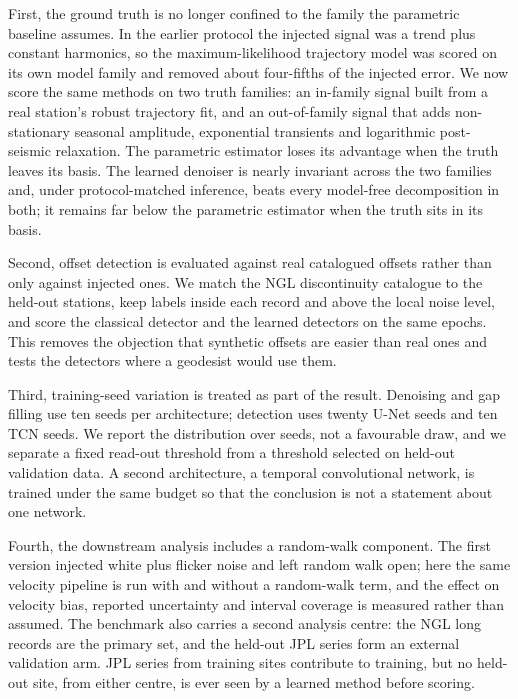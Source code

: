 First, the ground truth is no longer confined to the family the parametric
baseline assumes. In the earlier protocol the injected signal was a trend plus
constant harmonics, so the maximum-likelihood trajectory model was scored on its
own model family and removed about four-fifths of the injected error. We now
score the same methods on two truth families: an in-family signal built from a
real station's robust trajectory fit, and an out-of-family signal that adds
non-stationary seasonal amplitude, exponential transients and logarithmic
post-seismic relaxation. The parametric estimator loses its advantage when the
truth leaves its basis. The learned denoiser is nearly invariant across the two
families and, under protocol-matched inference, beats every model-free
decomposition in both; it remains far below the parametric estimator when the
truth sits in its basis.

Second, offset detection is evaluated against real catalogued offsets rather
than only against injected ones. We match the NGL discontinuity catalogue to the
held-out stations, keep labels inside each record and above the local noise
level, and score the classical detector and the learned detectors on the same
epochs. This removes the objection that synthetic offsets are easier than real
ones and tests the detectors where a geodesist would use them.

Third, training-seed variation is treated as part of the result. Denoising and
gap filling use ten seeds per architecture; detection uses twenty U-Net seeds
and ten TCN seeds. We report the
distribution over seeds, not a favourable draw, and we separate a fixed
read-out threshold from a threshold selected on held-out validation data. A
second architecture, a temporal convolutional network, is trained under the same
budget so that the conclusion is not a statement about one network.

Fourth, the downstream analysis includes a random-walk component. The first
version injected white plus flicker noise and left random walk open; here the
same velocity pipeline is run with and without a random-walk term, and the
effect on velocity bias, reported uncertainty and interval coverage is measured
rather than assumed. The benchmark also carries a second analysis centre: the
NGL long records are the primary set, and the held-out JPL series form an
external validation arm. JPL series from training sites contribute to training,
but no held-out site, from either centre, is ever seen by a learned method
before scoring.

